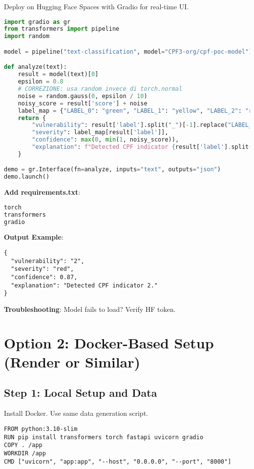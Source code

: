 \documentclass[11pt,a4paper]{article}
\begin{document}
Deploy on Hugging Face Spaces with Gradio for real-time UI.

\begin{lstlisting}[language=Python, caption=Gradio Interface]
import gradio as gr
from transformers import pipeline
import random

model = pipeline("text-classification", model="CPF3-org/cpf-poc-model")

def analyze(text):
    result = model(text)[0]
    epsilon = 0.8
    # CORREZIONE: usa random invece di torch.normal
    noise = random.gauss(0, epsilon / 10)
    noisy_score = result['score'] + noise
    label_map = {"LABEL_0": "green", "LABEL_1": "yellow", "LABEL_2": "red"}
    return {
        "vulnerability": result['label'].split("_")[-1].replace("LABEL_", ""),
        "severity": label_map[result['label']],
        "confidence": max(0, min(1, noisy_score)),
        "explanation": f"Detected CPF indicator {result['label'].split('_')[-1]}."
    }

demo = gr.Interface(fn=analyze, inputs="text", outputs="json")
demo.launch()
\end{lstlisting}

\textbf{Add requirements.txt}:
\begin{lstlisting}[language=bash, caption=requirements.txt]
torch
transformers
gradio
\end{lstlisting}

\textbf{Output Example}:
\begin{verbatim}
{
  "vulnerability": "2",
  "severity": "red",
  "confidence": 0.87,
  "explanation": "Detected CPF indicator 2."
}
\end{verbatim}

\textbf{Troubleshooting}: Model fails to load? Verify HF token.

\section{Option 2: Docker-Based Setup (Render or Similar)}

\subsection{Step 1: Local Setup and Data}

Install Docker. Use same data generation script.

\begin{lstlisting}[language=Docker, caption=Dockerfile]
FROM python:3.10-slim
RUN pip install transformers torch fastapi uvicorn gradio
COPY . /app
WORKDIR /app
CMD ["uvicorn", "app:app", "--host", "0.0.0.0", "--port", "8000"]
\end{lstlisting}
\end{document}
